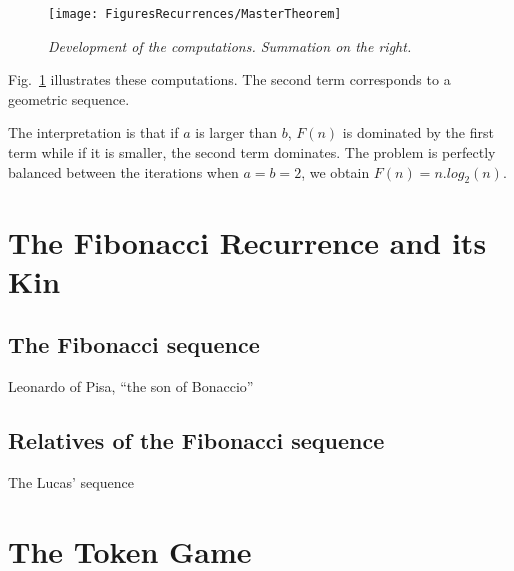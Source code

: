\begin{figure}[htb]
\begin{center}
       \texttt{[image: FiguresRecurrences/MasterTheorem]}
\caption{{\it Development of the computations. Summation on the right.}
\label{fig:masterTheorem}}
\end{center}
\end{figure}

Fig.~\ref{fig:masterTheorem} illustrates these computations.
The second term corresponds to a geometric sequence.

The interpretation is that if $a$ is larger than $b$, $F(n)$ is dominated by the first term while if it is smaller, the second term dominates.
The problem is perfectly balanced between the iterations when $a=b=2$, we obtain $F(n) = n.log_2(n)$. 


\section{The Fibonacci Recurrence and its Kin}
\label{sec:Fiboacci-plus}

\subsection{The Fibonacci sequence}

Leonardo of Pisa, ``the son of Bonaccio''



\subsection{Relatives of the Fibonacci sequence}

The Lucas' sequence

\section{The Token Game}
\label{sec:TokenGame}


